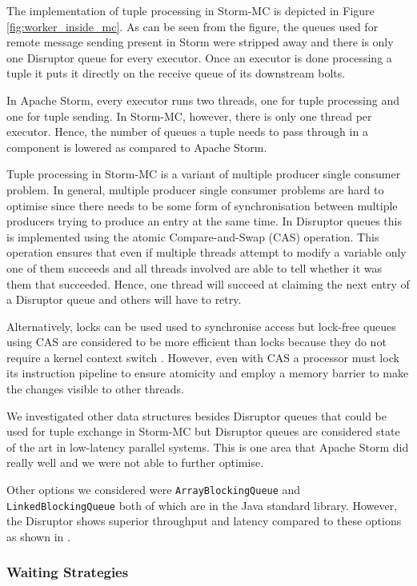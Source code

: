 The implementation of tuple processing in Storm-MC is depicted in Figure \ref{fig:worker_inside_mc}. As can be seen from the figure, the queues used for remote message sending present in Storm were stripped away and there is only one Disruptor queue for every executor. Once an executor is done processing a tuple it puts it directly on the receive queue of its downstream bolts.

In Apache Storm, every executor runs two threads, one for tuple processing and one for tuple sending. In Storm-MC, however, there is only one thread per executor. Hence, the number of queues a tuple needs to pass through in a component is lowered as compared to Apache Storm.

Tuple processing in Storm-MC is a variant of multiple producer single consumer problem. In general, multiple producer single consumer problems are hard to optimise since there needs to be some form of synchronisation between multiple producers trying to produce an entry at the same time. In Disruptor queues this is implemented using the atomic Compare-and-Swap (CAS) operation. This operation ensures that even if multiple threads attempt to modify a variable only one of them succeeds and all threads involved are able to tell whether it was them that succeeded. Hence, one thread will succeed at claiming the next entry of a Disruptor queue and others will have to retry.

Alternatively, locks can be used used to synchronise access but lock-free queues using CAS are considered to be more efficient than locks because they do not require a kernel context switch \cite{Thompson_Farley_Barker_Gee_Stewart_2011}. However, even with CAS a processor must lock its instruction pipeline to ensure atomicity and employ a memory barrier to make the changes visible to other threads.

We investigated other data structures besides Disruptor queues that could be used for tuple exchange in Storm-MC but Disruptor queues are considered state of the art in low-latency parallel systems. This is one area that Apache Storm did really well and we were not able to further optimise.

Other options we considered were \texttt{ArrayBlockingQueue} and \texttt{LinkedBlockingQueue} both of which are in the Java standard library. However, the Disruptor shows superior throughput and latency compared to these options as shown in \citep{DisruptorWiki}.

\subsubsection{Waiting Strategies}

